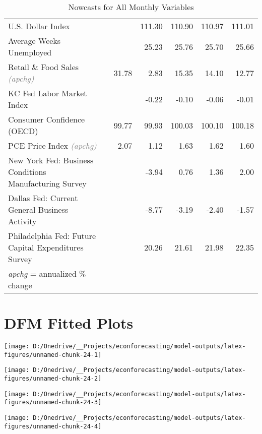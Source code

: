 \documentclass[11pt, letterpaper]{article}\usepackage[]{graphicx}\usepackage[]{color}
\begin{document}
\begin{table}[H]
\begin{tabular}{lrrrrrr}
  U.S. Dollar Index &  &  & 111.30 & 110.90 & 110.97 & 111.01 \\ 
  Average Weeks Unemployed &  &  & 25.23 & 25.76 & 25.70 & 25.66 \\ 
  Retail \& Food Sales \textit{\footnotesize\textcolor{gray}{(apchg)}} &  & 31.78 & 2.83 & 15.35 & 14.10 & 12.77 \\ 
  KC Fed Labor Market Index &  &  & -0.22 & -0.10 & -0.06 & -0.01 \\ 
  Consumer Confidence (OECD) &  & 99.77 & 99.93 & 100.03 & 100.10 & 100.18 \\ 
  PCE Price Index \textit{\footnotesize\textcolor{gray}{(apchg)}} &  & 2.07 & 1.12 & 1.63 & 1.62 & 1.60 \\ 
  New York Fed: Business Conditions Manufacturing Survey &  &  & -3.94 & 0.76 & 1.36 & 2.00 \\ 
  Dallas Fed: Current General Business Activity &  &  & -8.77 & -3.19 & -2.40 & -1.57 \\ 
  Philadelphia Fed: Future Capital Expenditures Survey &  &  & 20.26 & 21.61 & 21.98 & 22.35 \\ 
   \hline 
 \textit{apchg} = annualized \% change 
\end{tabular}
\endgroup
\caption{Nowcasts for All Monthly Variables} 
\end{table}



\appendix
\appendixpage
\addappheadtotoc

\section{DFM Fitted Plots}


{\centering \texttt{[image: D:/Onedrive/\_\_Projects/econforecasting/model-outputs/latex-figures/unnamed-chunk-24-1]} 

}




{\centering \texttt{[image: D:/Onedrive/\_\_Projects/econforecasting/model-outputs/latex-figures/unnamed-chunk-24-2]} 

}




{\centering \texttt{[image: D:/Onedrive/\_\_Projects/econforecasting/model-outputs/latex-figures/unnamed-chunk-24-3]} 

}




{\centering \texttt{[image: D:/Onedrive/\_\_Projects/econforecasting/model-outputs/latex-figures/unnamed-chunk-24-4]} 

}
\end{document}

